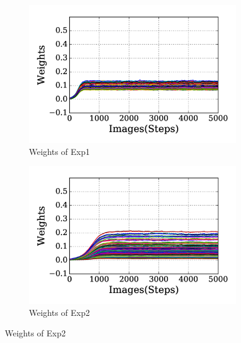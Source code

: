 \begin{figure}
	\centering
	\DIFdelbeginFL %
\DIFdelendFL \DIFaddbeginFL \begin{subfigure}[t]{0.48\textwidth}
		\DIFaddendFL \includegraphics[width=\textwidth]{pics_sdlm/21_exp_AE_noise/exp1_weights_s.png}
		\caption{Weights of Exp1}
	\end{subfigure}
	\DIFdelbeginFL %
\DIFdelendFL \DIFaddbeginFL \begin{subfigure}[t]{0.48\textwidth}
		\DIFaddendFL \includegraphics[width=\textwidth]{pics_sdlm/21_exp_AE_noise/exp2_weights_s.png}
		\caption{Weights of Exp2}
	\end{subfigure}
	\DIFdelbeginFL %

\end{figure}
